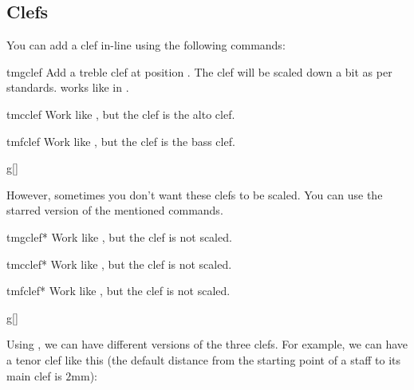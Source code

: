 \documentclass[11pt,a4paper]{ltxdoc}
\begin{document}
\subsection{Clefs}
You can add a clef in-line using the following commands:
\begin{docCommand}{tmgclef}{}
  Add a treble clef at position . The clef will be scaled down a bit 
  as per standards.  works like in .
\end{docCommand}
\begin{docCommand}{tmcclef}{}
  Work like , but the clef is the alto clef.
\end{docCommand}
\begin{docCommand}{tmfclef}{}
  Work like , but the clef is the bass clef.
\end{docCommand}
\begin{dispExample}
\begin{tmsinglestaff}
  \begin{tmstaff}{g}[]
  \end{tmstaff}
\end{tmsinglestaff}
\end{dispExample}
However, sometimes you don't want these clefs to be scaled. You can use the 
starred version of the mentioned commands.
\begin{docCommand}{tmgclef*}{}
  Work like , but the clef is not scaled.
\end{docCommand}
\begin{docCommand}{tmcclef*}{}
  Work like , but the clef is not scaled.
\end{docCommand}
\begin{docCommand}{tmfclef*}{}
  Work like , but the clef is not scaled.
\end{docCommand}
\begin{dispExample}
\begin{tmsinglestaff}
  \begin{tmstaff}{g}[]
  \end{tmstaff}%
\end{tmsinglestaff}
\end{dispExample}
Using , we can have different versions of the three clefs. For example, 
we can have a tenor clef like this (the default distance from the starting point 
of a staff to its main clef is $2$mm):
\begin{dispExample}
\begin{tmsinglestaff}
  \begin{tmstaff*}[]
  \end{tmstaff*}
\end{tmsinglestaff}
\end{dispExample}
\end{document}
